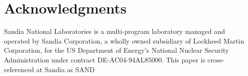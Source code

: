 \documentclass{ccr15}
\begin{document}
\section{Acknowledgments}
Sandia National Laboratories is a multi-program laboratory managed and operated by Sandia Corporation, a wholly owned subsidiary of Lockheed Martin Corporation, for the US Department of Energy{'}s National Nuclear Security Administration under contract DE-AC04-94AL85000. This paper is cross-referenced at Sandia as SAND


\nocite{ZAB:TechHPCG}
\nocite{ZAB:TechHPCG2}
\nocite{ZAB:Kokkos}
\nocite{ZAB:Trilinos}
\nocite{ZAB:Top500}
\nocite{ZAB:CUDA}
\nocite{ZAB:OpenMP}
\nocite{ZAB:PThreads}

%
\end{document}
